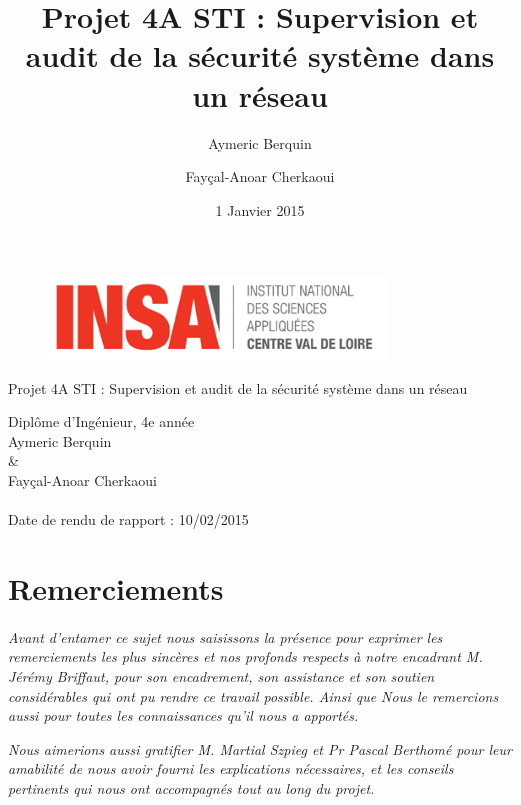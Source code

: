 \documentclass[11pt,a4paper,titlepage, oneside]{article}
\title{Projet 4A STI : Supervision et audit de la sécurité système dans un réseau}
\author{Aymeric Berquin \and Fayçal-Anoar Cherkaoui}
\date{1 Janvier 2015}
\begin{document}
\begin{titlepage}
 \thispagestyle{empty}
\begin{figure}[h]
  \centering
  \includegraphics[width=0.8\textwidth,natwidth=610,natheight=642]{images/logo.png}
\end{figure}
\vspace{0,5cm}
\begin{center} 
\Huge{\textbf{{\color{red}}}Projet 4A STI : Supervision et audit de la sécurité système dans un réseau}
\\
\vspace{1.5 cm}

\vspace{1cm}
\large{Diplôme d'Ingénieur, 4e année}
\\
\vspace{1cm}
\large{Aymeric Berquin \\ \& \\ Fayçal-Anoar Cherkaoui}
\vspace{1 cm}
\paragraph{}
	\Large{Date de rendu de rapport : 10/02/2015}
	\\
	
\vspace{1.5 cm}
\end{center} 
\end{titlepage} 
\normalsize
\newpage
\section*{\textbf{Remerciements}}
\thispagestyle{empty}
	\paragraph{}
	\begin{large}
	
	\textit{
		Avant d’entamer ce sujet nous saisissons la présence pour exprimer les remerciements les plus sincères et nos profonds respects à notre encadrant M. Jérémy Briffaut, pour son encadrement, son assistance et son soutien considérables qui ont pu rendre ce travail possible. Ainsi que Nous le remercions aussi pour toutes les connaissances qu'il nous a apportés.}
	
	\textit{
		Nous aimerions aussi gratifier M. Martial Szpieg et Pr Pascal Berthomé  pour leur amabilité de nous avoir fourni les explications nécessaires, et les conseils pertinents qui nous ont accompagnés tout au long du projet.}\end{large}
\newpage
\end{document}

